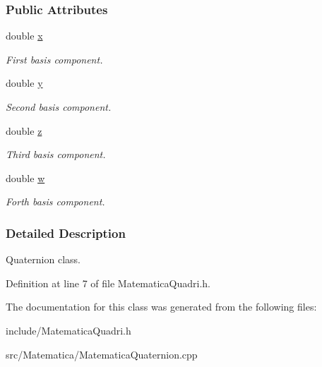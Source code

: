 \subsubsection*{\-Public \-Attributes}
\begin{DoxyCompactItemize}
\item 
\hypertarget{classQuadri_af88b946fb90d5f08b5fb740c70e98c10}{double \hyperlink{classQuadri_af88b946fb90d5f08b5fb740c70e98c10}{x}}\label{classQuadri_af88b946fb90d5f08b5fb740c70e98c10}

\begin{DoxyCompactList}\small\item\em \-First basis component. \end{DoxyCompactList}\item 
\hypertarget{classQuadri_ab927965981178aa1fba979a37168db2a}{double \hyperlink{classQuadri_ab927965981178aa1fba979a37168db2a}{y}}\label{classQuadri_ab927965981178aa1fba979a37168db2a}

\begin{DoxyCompactList}\small\item\em \-Second basis component. \end{DoxyCompactList}\item 
\hypertarget{classQuadri_ab3e6ed577a7c669c19de1f9c1b46c872}{double \hyperlink{classQuadri_ab3e6ed577a7c669c19de1f9c1b46c872}{z}}\label{classQuadri_ab3e6ed577a7c669c19de1f9c1b46c872}

\begin{DoxyCompactList}\small\item\em \-Third basis component. \end{DoxyCompactList}\item 
\hypertarget{classQuadri_afb3248bab1c7ee0ad97e9d4c275b4c67}{double \hyperlink{classQuadri_afb3248bab1c7ee0ad97e9d4c275b4c67}{w}}\label{classQuadri_afb3248bab1c7ee0ad97e9d4c275b4c67}

\begin{DoxyCompactList}\small\item\em \-Forth basis component. \end{DoxyCompactList}\end{DoxyCompactItemize}


\subsubsection{\-Detailed \-Description}
\-Quaternion class. 

\-Definition at line 7 of file \-Matematica\-Quadri.\-h.



\-The documentation for this class was generated from the following files\-:\begin{DoxyCompactItemize}
\item 
include/\-Matematica\-Quadri.\-h\item 
src/\-Matematica/\-Matematica\-Quaternion.\-cpp\end{DoxyCompactItemize}
